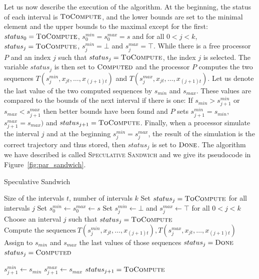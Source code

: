 \documentclass[a4paper,10pt]{article}
\newcommand{\todo}[1]{{\color{red} TODO: {#1}}}
\begin{document}
Let us now describe the execution of the algorithm. At the beginning, the status of each interval is $\textsc{ToCompute}$, and the lower bounds are set to the minimal element and the upper bounds to the maximal except for the first: 
$status_0 = \textsc{ToCompute}$, $s_0^{min} = s_0^{max} = s$ and for all $0 < j < k$, $status_j = \textsc{ToCompute}$,  $s_j^{min} = \bot$ and $s_j^{max} = \top$. 
While there is a free processor $P$ and an index $j$ such that $status_j = \textsc{ToCompute}$, the index $j$ is selected. The variable $status_j$ is then set to $\textsc{Computed}$ and the processor $P$ computes the two sequences $T(s_j^{min},x_{jt},\dots,x_{(j+1)t})$ and $T(s_j^{max},x_{jt},\dots,x_{(j+1)t})$. 
Let us denote the last value of the two computed sequences by $s_{min}$ and $s_{max}$. These values are compared to the bounds of the next interval if there is one: If $s_{min} > s_{j+1}^{min}$ or $ s_{max} < s_{j+1}^{max}$ then better bounds have been found and $P$ sets $s_{j+1}^{min} = s_{min}$, $s_{j+1}^{max} = s_{max})$ and $status_{j+1} = \textsc{ToCompute}$.
Finally, when a processor simulate the interval $j$ and at the beginning $s_j^{min} = s_j^{max}$, the result of the simulation is  the correct trajectory and thus stored, then $status_j$ is set to $\textsc{Done}$.
The algorithm we have described is called \textsc{Speculative Sandwich} and we give its pseudocode in Figure~\ref{fig:par_sandwich}.
% 
  	\begin{algorithm}[H]
  	\caption{Speculative Sandwich}
  	\label{fig:par_sandwich}
  	\begin{algorithmic}
 	\REQUIRE Size of the intervals $t$, number of intervals $k$
  	\STATE Set $status_j = \textsc{ToCompute}$ for all intervals $j$
	\STATE Set $s_0^{min} \leftarrow s_0^{max} \leftarrow s$
	\STATE  Set $s_j^{min} \leftarrow \bot$ and $s_j^{max} \leftarrow \top$ for all $0 < j < k$
	\STATE 
	\STATE Choose an interval $j$ such that $status_j = \textsc{ToCompute}$ 
	\STATE $\text{Compute  the sequences}~ T(s_j^{min},x_{jt},\dots,x_{(j+1)t}), T(s_j^{max},x_{jt},\dots,x_{(j+1)t})$
	\STATE Assign to $s_{min}$ and $s_{max}$ the last values of those sequences
	\STATE $status_j = \textsc{Done}$
	\ELSE
	\STATE $status_j = \textsc{Computed}$
	\ENDIF
	
		\STATE $s_{j+1}^{min} \leftarrow s_{min}$
		\STATE $s_{j+1}^{max} \leftarrow s_{max}$ 
		\STATE $status_{j+1} = \textsc{ToCompute}$
		\ENDIF
	\ENDIF
	
  	\ENDWHILE
  
  	\end{algorithmic}
  	\end{algorithm}
%  
 
\end{document}
